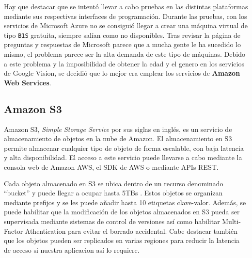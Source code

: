 Hay que destacar que se intentó llevar a cabo pruebas en las distintas plataformas mediante sus respectivas interfaces de programación. Durante las pruebas, con los servicios de Microsoft Azure no se consiguió llegar a crear una máquina virtual de tipo \texttt{B1S} gratuita, siempre salían como no disponibles. Tras revisar la página de preguntas y respuestas de Microsoft parece que a mucha gente le ha sucedido lo mismo, el problema parece ser la alta demanda de este tipo de máquinas. Debido a este problema y la imposibilidad de obtener la edad y el genero en los servicios de Google Vision, se decidió que lo mejor era emplear los servicios de \textbf{Amazon Web Services}.

\subsection{Amazon S3}
Amazon S3, \textit{Simple Storage Service} por sus siglas en inglés, es un servicio de almacenamiento de objetos en la nube de Amazon. El almacenamiento en S3 permite almacenar cualquier tipo de objeto de forma escalable, con baja latencia y alta disponibilidad. El acceso a este servicio puede llevarse a cabo mediante la consola web de Amazon AWS, el SDK de AWS o mediante APIs REST.

Cada objeto almacenado en S3 se ubica dentro de un recurso denominado ``bucket'' y puede llegar a ocupar hasta 5TBs \cite{amazon_s3}. Estos objetos se organizan mediante prefijos y se les puede añadir hasta 10 etiquetas clave-valor. Además, se puede habilitar que la modificación de los objetos almacenados en S3 pueda ser supervisada mediante sistemas de control de versiones así como habilitar Multi-Factor Athentication para evitar el borrado accidental. Cabe destacar también que los objetos pueden ser replicados en varias regiones para reducir la latencia de acceso si nuestra aplicacion así lo requiere.

